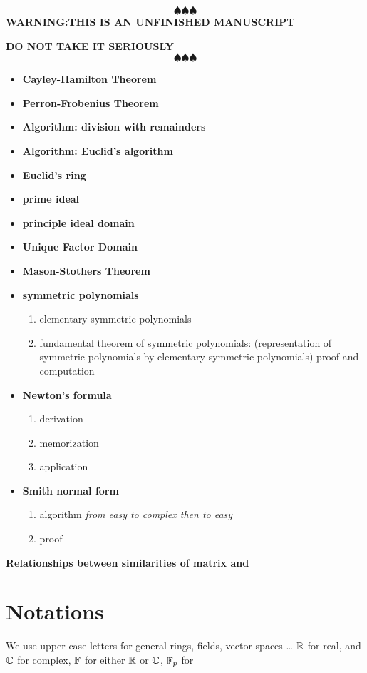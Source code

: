 \documentclass{book}
\begin{document}
\[\spadesuit\spadesuit\spadesuit\]
\textbf{WARNING:THIS IS AN UNFINISHED MANUSCRIPT}\par
\textbf{DO NOT TAKE IT SERIOUSLY}
\[\spadesuit\spadesuit\spadesuit\]
\begin{itemize}
\item \textbf{Cayley-Hamilton Theorem}
\item \textbf{Perron-Frobenius Theorem}
\item \textbf{Algorithm: division with remainders}
\item \textbf{Algorithm: Euclid's algorithm}
\item \textbf{Euclid's ring}
\item \textbf{prime ideal}
\item \textbf{principle ideal domain}
\item \textbf{Unique Factor Domain}
\item \textbf{Mason-Stothers Theorem} 
\item \textbf{symmetric polynomials}
\begin{enumerate}
    \item elementary symmetric polynomials
    \item fundamental theorem of symmetric polynomials: (representation of symmetric polynomials by elementary symmetric polynomials) proof and computation
\end{enumerate}
\item \textbf{Newton's formula} 
\begin{enumerate}
    \item derivation
    \item memorization
    \item application
\end{enumerate}
\item \textbf{Smith normal form} 
\begin{enumerate}
    \item algorithm \textit{from easy to complex then to easy}
    \item proof
\end{enumerate}
\end{itemize}
\textbf{Relationships between similarities of matrix and }

\section{Notations}

We use upper case letters for general rings, fields, vector spaces \dots
$\mathbb{R}$ for real, and $\mathbb{C}$ for complex, $\mathbb{F}$ for either $\mathbb{R}$ or $\mathbb{C}$, $\mathbb{F}_p$ for 












\end{document}
